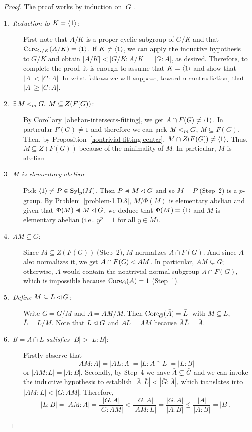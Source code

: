 \begin{proof} The proof works by induction on $|G|$.

\begin{description}
    
    \item[\rm1.~\textit{Reduction to $K=\langle1\rangle$\/}:] First note that $A/K$ is a proper cyclic subgroup of $G/K$ and that ${\rm Core}_{G/K}(A/K)=\langle1\rangle$. If $K\ne\langle1\rangle$, we can apply the inductive hypothesis to $G/K$ and obtain $|A/K|<|G/K:A/K|=|G:A|$, as desired. Therefore, to complete the proof, it is enough to assume that $K=\langle1\rangle$ and show that $|A|<|G:A|$. In what follows we will suppose, toward a contradiction, that $|A|\ge|G:A|$.

    \item[\rm2.~\textit{$\exists\,M\lhd_mG,\; M\subseteq Z(F(G))$\/}:] By Corollary~\ref{abelian-intersects-fitting}, we get $A\cap F(G)\ne\langle1\rangle$. In particular $F(G)\ne1$ and therefore we can pick $M\lhd_m G$, $M\subseteq F(G)$. Then, by Proposition~\ref{nontrivial-fitting-center}, $M\cap Z(F(G))\ne\langle1\rangle$. Thus, $M\subseteq Z(F(G))$ because of the minimality of $M$. In particular, $M$ is abelian.

    \item[\rm3.~\textit{$M$ is elementary abelian\/}:] Pick $\langle1\rangle\ne P\in{\rm Syl}_p(M)$. Then $P\ch M\normal G$ and so $M=P$ (Step~2) is a $p$-group. By Problem~\ref{problem-1.D.8}, $M/\Phi(M)$ is elementary abelian and given that $\Phi(M)\ch M\normal G$, we deduce that $\Phi(M)=\langle1\rangle$ and $M$ is elementary abelian (i.e., $y^p=1$ for all $y\in M$).

    \item[\rm4.~\textit{$AM\varsubsetneq G$\/}:] Since $M\subseteq Z(F(G))$ (Step~2), $M$ normalizes $A\cap F(G)$. And since $A$ also normalizes it, we get $A\cap F(G)\lhd AM$. In particular, $AM\varsubsetneq G$; otherwise, $A$ would contain the nontrivial normal subgroup $A\cap F(G)$, which is impossible because ${\rm Core}_G(A)=1$ (Step~1).

    \item[\rm5.~\textit{Define $M\subseteq L\lhd G$\/}:] Write $\bar G=G/M$ and $\bar A=AM/M$. Then ${\rm Core}_{\bar G}(\bar A)=\bar L$, with $M\subseteq L$, $\bar L=L/M$. Note that $L\lhd G$ and $AL=AM$ because $\bar A\bar L=\bar A$.

    \item[\rm6.~\textit{$B=A\cap L$ satisfies $|B|>|L:B|$\/}:] Firstly observe that
    $$
        |AM:A|=|AL:A|=|L:A\cap L|=|L:B|
    $$
    or $|AM:L|=|A:B|$. Secondly, by Step~4 we have $\bar A\varsubsetneq\bar G$ and we can invoke the inductive hypothesis to establish $|\bar A:\bar L|<|\bar G:\bar A|$, which translates into $|AM:L|<|G:AM|$. Therefore,
    $$
        |L:B|=|AM:A|=\frac{|G:A|}{|G:AM|}<\frac{|G:A|}{|AM:L|}
            =\frac{|G:A|}{|A:B|}\le\frac{|A|}{|A:B|}=|B|.
    $$


\end{description}
\end{proof}

